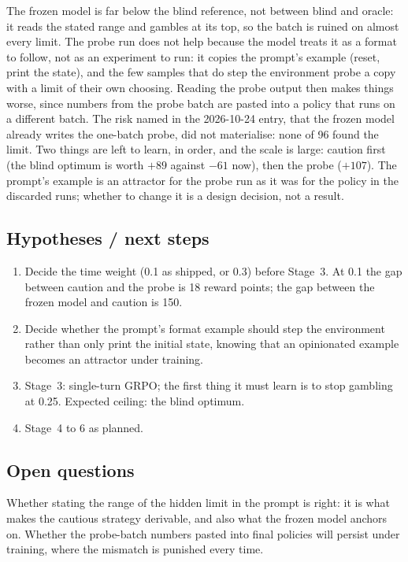 \documentclass[11pt,a4paper]{article}
\begin{document}
The frozen model is far below the blind reference, not between blind and
oracle: it reads the stated range and gambles at its top, so the batch is
ruined on almost every limit. The probe run does not help because the model
treats it as a format to follow, not as an experiment to run: it copies the
prompt's example (reset, print the state), and the few samples that do step
the environment probe a copy with a limit of their own choosing. Reading the
probe output then makes things worse, since numbers from the probe batch are
pasted into a policy that runs on a different batch. The risk named in the
2026-10-24 entry, that the frozen model already writes the one-batch probe,
did not materialise: none of 96 found the limit. Two things are left to
learn, in order, and the scale is large: caution first (the blind optimum is
worth $+89$ against $-61$ now), then the probe ($+107$). The prompt's example
is an attractor for the probe run as it was for the policy in the discarded
runs; whether to change it is a design decision, not a result.

\subsection*{Hypotheses / next steps}

\begin{enumerate}[nosep]
\item Decide the time weight (0.1 as shipped, or 0.3) before Stage~3. At 0.1
  the gap between caution and the probe is 18 reward points; the gap between
  the frozen model and caution is 150.
\item Decide whether the prompt's format example should step the environment
  rather than only print the initial state, knowing that an opinionated
  example becomes an attractor under training.
\item Stage~3: single-turn GRPO; the first thing it must learn is to stop
  gambling at 0.25. Expected ceiling: the blind optimum.
\item Stage~4 to 6 as planned.
\end{enumerate}

\subsection*{Open questions}

Whether stating the range of the hidden limit in the prompt is right: it is
what makes the cautious strategy derivable, and also what the frozen model
anchors on. Whether the probe-batch numbers pasted into final policies will
persist under training, where the mismatch is punished every time.
\end{document}
